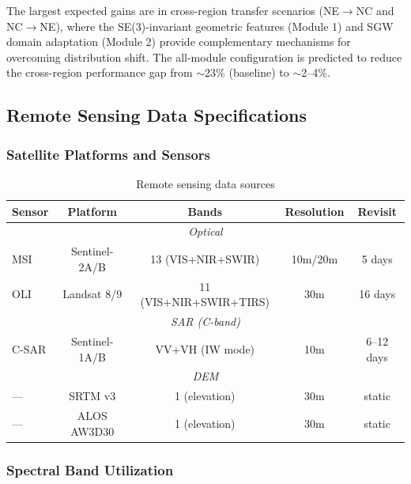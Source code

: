 The largest expected gains are in cross-region transfer scenarios (NE$\to$NC
and NC$\to$NE), where the SE(3)-invariant geometric features (Module 1) and
SGW domain adaptation (Module 2) provide complementary mechanisms for
overcoming distribution shift. The all-module configuration is predicted to
reduce the cross-region performance gap from $\sim$23\% (baseline) to
$\sim$2--4\%.

\subsection{Remote Sensing Data Specifications}

\subsubsection{Satellite Platforms and Sensors}

\begin{table}[h]
\centering
\caption{Remote sensing data sources}
\begin{tabular}{lcccc}
\toprule
\textbf{Sensor} & \textbf{Platform} & \textbf{Bands} & \textbf{Resolution} & \textbf{Revisit} \\
\midrule
\multicolumn{5}{c}{\textit{Optical}} \\
MSI & Sentinel-2A/B & 13 (VIS+NIR+SWIR) & 10m/20m & 5 days \\
OLI & Landsat 8/9 & 11 (VIS+NIR+SWIR+TIRS) & 30m & 16 days \\
\multicolumn{5}{c}{\textit{SAR (C-band)}} \\
C-SAR & Sentinel-1A/B & VV+VH (IW mode) & 10m & 6--12 days \\
\multicolumn{5}{c}{\textit{DEM}} \\
--- & SRTM v3 & 1 (elevation) & 30m & static \\
--- & ALOS AW3D30 & 1 (elevation) & 30m & static \\
\bottomrule
\end{tabular}
\end{table}

\subsubsection{Spectral Band Utilization}

